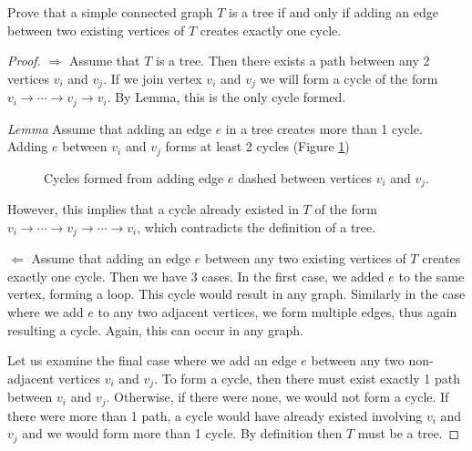 \documentclass[11pt, oneside]{article}   	%
\begin{document}
Prove that a simple connected graph $T$ is a tree if and only if adding an edge between two existing vertices of $T$ creates exactly one cycle.
\begin{proof}
$\Rightarrow$ Assume that $T$ is a tree. Then there exists a path between any 2 vertices $v_i$ and $v_j$. If we join vertex $v_i$ and $v_j$ we will form a cycle of the form $v_i \to \cdots \to v_j \to v_i$. By Lemma, this is the only cycle formed. 

\emph{Lemma} Assume that adding an edge $e$ in a tree creates more than 1 cycle. Adding $e$ between $v_i$ and $v_j$ forms at least 2 cycles (Figure \ref{q52})

\begin{figure}[h]
	\centering
        \caption{Cycles formed from adding edge $e$ dashed between vertices $v_i$ and $v_j$.}
        \label{q52}
 \end{figure}
 However, this implies that a cycle already existed in $T$ of the form $v_i \to \cdots \to v_j \to \cdots \to v_i$, which contradicts the definition of a tree.


$\Leftarrow$ Assume that adding an edge $e$ between any two existing vertices of $T$ creates exactly one cycle. Then we have 3 cases. In the first case, we added $e$ to the same vertex, forming a loop. This cycle would result in any graph. Similarly in the case where we add $e$ to any two adjacent vertices, we form multiple edges, thus again resulting a cycle. Again, this can occur in any graph.

Let us examine the final case where we add an edge $e$ between any two non-adjacent vertices $v_i$ and $v_j$. To form a cycle, then there must exist exactly 1 path between $v_i$ and $v_j$. Otherwise, if there were none, we would not form a cycle. If there were more than 1 path, a cycle would have already existed involving $v_i$ and $v_j$ and we would form more than 1 cycle. By definition then $T$ must be a tree.
\end{proof}
\end{document}
